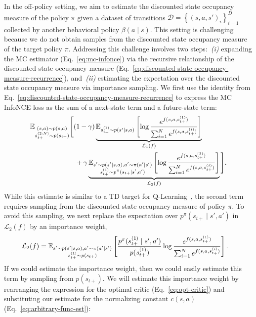 \documentclass{article} %
\begin{document}
In the off-policy setting, we aim to estimate the discounted state occupancy measure of the policy $\pi$ given a dataset of transitions $\mathcal{D} = \left\{(s, a, s')_{i} \right\}_{i = 1}^{D}$ collected by another behavioral policy $\beta(a \mid s)$. This setting is challenging because we do not obtain samples from the discounted state occupancy measure of the target policy $\pi$. Addressing this challenge involves two steps:~\emph{(i)} expanding the MC estimator (Eq.~\ref{eq:mc-infonce}) via the recursive relationship of the discounted state occupancy measure (Eq.~\ref{eq:discounted-state-occupancy-measure-recurrence}), and~\emph{(ii)} estimating the expectation over the discounted state occupancy measure via importance sampling. We first use the identity from Eq.~\ref{eq:discounted-state-occupancy-measure-recurrence} to express the MC InfoNCE loss as the sum of a next-state term and a future-state term:
\begin{align*}
     &\mathbb{E}_{\substack{ (s, a) \sim p(s, a) \\ s_{t+}^{(2:N)} \sim p(s_{t+}) }} \Bigg[ (1 - \gamma) \underbrace{ \mathbb{E}_{s_{t+}^{(1)} \sim p(s' \mid s, a)} \left[ \log \frac{ e^{ f(s, a, s_{t+}^{(1)}) } }{\sum_{i = 1}^N e^{ f(s, a, s_{t+}^{(i)}) }} \right]}_{ \mathcal{L}_1(f) }  \nonumber \\
    & \hspace{6.5em} + \gamma \underbrace{ \mathbb{E}_{ \substack{s' \sim p(s' \mid s, a), a' \sim \pi(a' \mid s') \\ s_{t+}^{(1)} \sim p^{\pi}(s_{t+} \mid s', a')}} \left[ \log \frac{ e^{ f(s, a, s_{t+}^{(1)}) } }{\sum_{i = 1}^N e^{ f(s, a, s_{t+}^{(i)}) }} \right] }_{\mathcal{L}_2(f)} \Bigg].
\end{align*}
While this estimate is similar to a TD target for Q-Learning~\citep{watkins1992q, fu2019diagnosing}, the second term requires sampling from the discounted state occupancy measure of policy $\pi$. To avoid this sampling, we next replace the expectation over $p^{\pi}(s_{t+} \mid s', a')$ in $\mathcal{L}_2(f)$ by an importance weight, 
\begin{align*}
    {\mathcal{L}}_2(f) &= \mathbb{E}_{ \substack{s' \sim p(s' \mid s, a), a' \sim \pi(a' \mid s') \\ s_{t+}^{(1)} \sim p(s_{t+})}} \left[ \frac{ p^{\pi}(s_{t+}^{(1)} \mid s', a') }{p(s_{t+}^{(1)})} \log \frac{ e^{ f(s, a, s_{t+}^{(1)}) } }{\sum_{i = 1}^N e^{ f(s, a, s_{t+}^{(i)}) }} \right].
\end{align*}
If we could estimate the importance weight, then we could easily estimate this term by sampling from $p(s_{t+})$. We will estimate this importance weight by rearranging the expression for the optimal critic (Eq.~\ref{eq:opt-critic}) and substituting our estimate for the normalizing constant $c(s, a)$ (Eq.~\ref{eq:arbitrary-func-est}):
\end{document}
